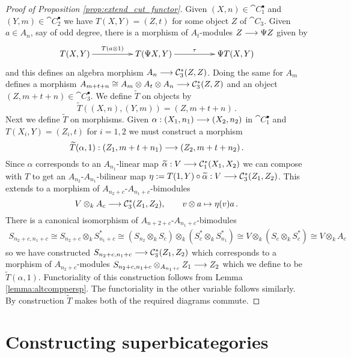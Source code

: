 \documentclass[english,letter paper,12pt,leqno]{article}
\theoremstyle{example}
\numberwithin{equation}{section}
\begin{document}
\begin{proof}[Proof of Proposition \ref{prop:extend_cut_functor}]
Given $(X,n) \in \cat{C}_1^\bullet$ and $(Y,m) \in \cat{C}_2^\bullet$ we have $T(X,Y) = (Z,t)$ for some object $Z$ of $\cat{C}_3$. Given $a \in A_n$, say of odd degree, there is a morphism of $A_t$-modules $Z \longrightarrow \Psi Z$ given by
\[
\xymatrix@C+2pc{
T(X,Y) \ar[r]^-{T(a \otimes 1)} & T(\Psi X, Y ) \ar[r]^-{\tau} & \Psi T(X,Y)
}
\]
and this defines an algebra morphism $A_n \longrightarrow \mathcal{C}_3^*(Z,Z)$. Doing the same for $A_m$ defines a morphism $A_{m+t+n} \cong A_m \otimes A_t \otimes A_n \longrightarrow \mathcal{C}_3^*(Z,Z)$ and an object $(Z, m + t +n) \in \cat{C}_3^\bullet$. We define $\widetilde{T}$ on objects by
\begin{equation}\label{eq:ttilde}
\widetilde{T}( (X,n), (Y,m) ) = (Z, m + t + n)\,.
\end{equation}
Next we define $\widetilde{T}$ on morphisms. Given $\alpha: (X_1,n_1) \longrightarrow (X_2,n_2)$ in $\cat{C}_1^\bullet$ and $T(X_i,Y) = (Z_i,t)$ for $i = 1,2$ we must construct a morphism
\[
\widetilde{T}(\alpha,1): (Z_1, m+t+n_1) \longrightarrow (Z_2, m+t+n_2)\,.
\]
Since $\alpha$ corresponds to an $A_{n_1}$-linear map $\widetilde{\alpha}: V \longrightarrow \mathcal{C}_1^*(X_1,X_2)$ we can compose with $T$ to get an $A_{n_2}$-$A_{n_1}$-bilinear map $\eta := T(1,Y) \circ \widetilde{\alpha}: V \longrightarrow \mathcal{C}_3^*(Z_1,Z_2)$. This extends to a morphism of $A_{n_2+c}$-$A_{n_1+c}$-bimodules
\[
V \otimes_k A_c \longrightarrow \mathcal{C}_3^*(Z_1,Z_2), \qquad v \otimes a \mapsto \eta(v) a\,.
\]
There is a canonical isomorphism of $A_{n+2+c}$-$A_{n_1+c}$-bimodules
\begin{align*}
S_{n_2+c,n_1+c} \cong S_{n_2+c} \otimes_k S_{n_1+c}^* \cong (S_{n_2} \otimes_k S_c) \otimes_k (S_c^* \otimes_k S_{n_1}^*) \cong V \otimes_k (S_c \otimes_k S_c^*) \cong V \otimes_k A_c
\end{align*}
so we have constructed $S_{n_2+c,n_1+c} \longrightarrow \mathcal{C}_3^*(Z_1,Z_2)$ which corresponds to a morphism of $A_{n_2+c}$-modules $S_{n_2+c, n_1+c} \otimes_{A_{n_1+c}} Z_1 \longrightarrow Z_2$ which we define to be $\widetilde{T}(\alpha,1)$. Functoriality of this construction follows from Lemma \ref{lemma:altcomppersp}. The functoriality in the other variable follows similarly. By construction $\widetilde{T}$ makes both of the required diagrams commute.
\end{proof}

\section{Constructing superbicategories}\label{section:constructing_superbicategories}
\end{document}
